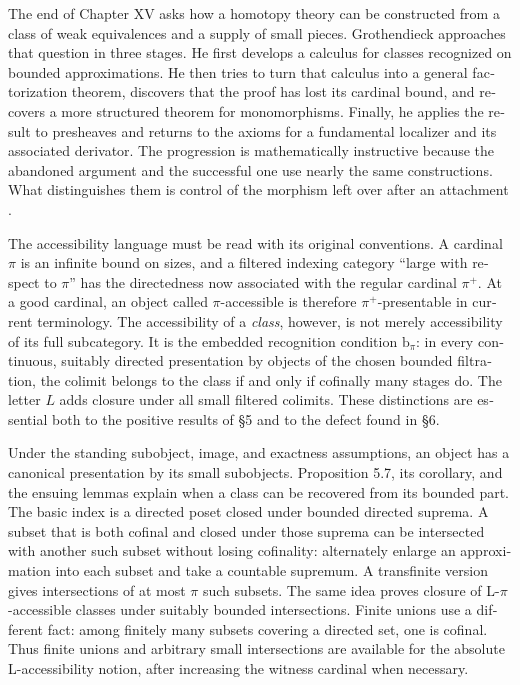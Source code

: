 \begin{otherlanguage}{english}
The end of Chapter XV asks how a homotopy theory can be constructed from a class of weak equivalences and a supply of small pieces. Grothendieck approaches that question in three stages. He first develops a calculus for classes recognized on bounded approximations. He then tries to turn that calculus into a general factorization theorem, discovers that the proof has lost its cardinal bound, and recovers a more structured theorem for monomorphisms. Finally, he applies the result to presheaves and returns to the axioms for a fundamental localizer and its associated derivator. The progression is mathematically instructive because the abandoned argument and the successful one use nearly the same constructions. What distinguishes them is control of the morphism left over after an attachment \citep{Grothendieck1990XV}.

The accessibility language must be read with its original conventions. A cardinal $\pi$ is an infinite bound on sizes, and a filtered indexing category “large with respect to $\pi$” has the directedness now associated with the regular cardinal $\pi^+$. At a good cardinal, an object called $\pi$-accessible is therefore $\pi^+$-presentable in current terminology. The accessibility of a \emph{class}, however, is not merely accessibility of its full subcategory. It is the embedded recognition condition $\mathrm b_\pi$: in every continuous, suitably directed presentation by objects of the chosen bounded filtration, the colimit belongs to the class if and only if cofinally many stages do. The letter $L$ adds closure under all small filtered colimits. These distinctions are essential both to the positive results of \S5 and to the defect found in \S6.

Under the standing subobject, image, and exactness assumptions, an object has a canonical presentation by its small subobjects. Proposition 5.7, its corollary, and the ensuing lemmas explain when a class can be recovered from its bounded part. The basic index is a directed poset closed under bounded directed suprema. A subset that is both cofinal and closed under those suprema can be intersected with another such subset without losing cofinality: alternately enlarge an approximation into each subset and take a countable supremum. A transfinite version gives intersections of at most $\pi$ such subsets. The same idea proves closure of L-$\pi$-accessible classes under suitably bounded intersections. Finite unions use a different fact: among finitely many subsets covering a directed set, one is cofinal. Thus finite unions and arbitrary small intersections are available for the absolute L-accessibility notion, after increasing the witness cardinal when necessary.


\end{otherlanguage}
